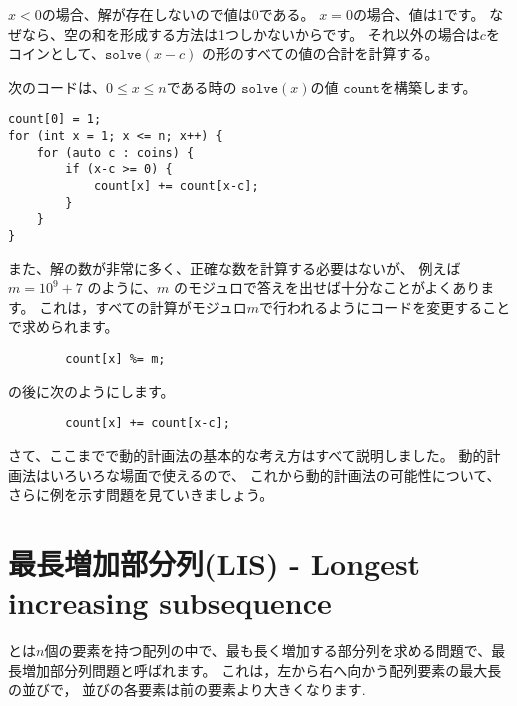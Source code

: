$x < 0$の場合、解が存在しないので値は0である。
$x = 0$の場合、値は1です。
なぜなら、空の和を形成する方法は1つしかないからです。
それ以外の場合は$c$をコインとして、$\texttt{solve}(x-c)$ の形のすべての値の合計を計算する。

次のコードは、$0 \le x \le n$である時の
$\texttt{solve}(x)$の値
$\texttt{count}$を構築します。 

\begin{lstlisting}
count[0] = 1;
for (int x = 1; x <= n; x++) {
    for (auto c : coins) {
        if (x-c >= 0) {
            count[x] += count[x-c];
        }
    }
}
\end{lstlisting}

また、解の数が非常に多く、正確な数を計算する必要はないが、
例えば $m=10^9+7$ のように、$m$ のモジュロで答えを出せば十分なことがよくあります。
これは，すべての計算がモジュロ$m$で行われるようにコードを変更することで求められます。

\begin{lstlisting}
        count[x] %= m;
\end{lstlisting}
の後に次のようにします。
\begin{lstlisting}
        count[x] += count[x-c];
\end{lstlisting}

さて、ここまでで動的計画法の基本的な考え方はすべて説明しました。
動的計画法はいろいろな場面で使えるので、
これから動的計画法の可能性について、
さらに例を示す問題を見ていきましょう。

\section{最長増加部分列(LIS) - Longest increasing subsequence}


とは$n$個の要素を持つ配列の中で、最も長く増加する部分列を求める問題で、最長増加部分列問題と呼ばれます。
これは，左から右へ向かう配列要素の最大長の並びで，
並びの各要素は前の要素より大きくなります.

